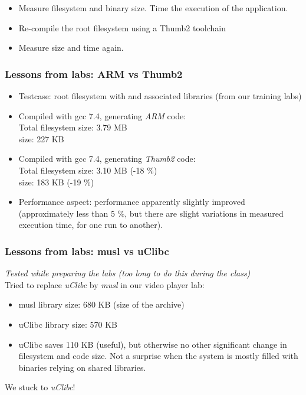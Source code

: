 {
\begin{itemize}
\item Measure filesystem and  binary size. Time
      the execution of the application.
\item Re-compile the root filesystem using a Thumb2 toolchain
\item Measure size and time again.
\end{itemize}
}

\begin{frame}
\frametitle{Lessons from labs: ARM vs Thumb2}
\begin{itemize}
\item Testcase: root filesystem with  and associated
      libraries (from our training labs)
\item Compiled with gcc 7.4, generating {\em ARM} code:\\
      Total filesystem size: 3.79 MB\\
       size: 227 KB
\item Compiled with gcc 7.4, generating {\em Thumb2} code:\\
      Total filesystem size: 3.10 MB (-18 \%)\\
       size: 183 KB (-19 \%)
\item Performance aspect: performance apparently slightly improved
      (approximately less than 5 \%, but there are slight variations in measured
      execution time, for one run to another).
\end{itemize}
\end{frame}

\begin{frame}
\frametitle{Lessons from labs: musl vs uClibc}
{\em Tested while preparing the labs (too long to do this during the
class)}\\

Tried to replace {\em uClibc} by {\em musl} in our video player lab:
\begin{itemize}
   \item musl library size: 680 KB (size of the   archive)
   \item uClibc library size: 570 KB
   \item uClibc saves 110 KB (useful), but otherwise no other significant change
    in filesystem and code size. Not a surprise when the system is mostly filled
    with binaries relying on shared libraries.
\end{itemize}
We stuck to {\em uClibc}!
\end{frame}
